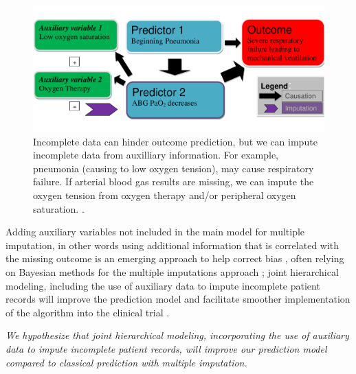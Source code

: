 \documentclass[11pt,notitlepage]{article}
\begin{document}
\begin{figure} 
 \vspace{-30pt}
 \includegraphics[scale=0.4]{Figures/Bayesian_imputation.pdf}
    \vspace{-20pt}
  \caption{\footnotesize Incomplete data can hinder outcome prediction, but we can impute incomplete data from auxilliary information. For example, pneumonia (causing to low oxygen tension), may cause respiratory failure. If arterial blood gas results are missing, we can impute the oxygen tension from oxygen therapy and/or peripheral oxygen saturation.  \cite{Hall_25389642}.}
   \vspace{-20pt}
    \label{fig:Imputation_fig}
\end{figure}

Adding auxiliary variables not included in the main model for multiple imputation, in other words using additional information that is correlated with the missing outcome is an emerging approach to help correct bias \cite{Meng_1994, Collins_11778676, Rubin_1996}, often relying on Bayesian methods for the multiple imputations approach \cite{Daniels_2008, Schafer_1997}; joint hierarchical modeling, including the use of auxiliary data to impute incomplete patient records will improve the prediction model and facilitate smoother implementation of the algorithm into the clinical trial \cite{Hall_25389642}.

\emph{We hypothesize that joint hierarchical modeling, incorporating the use of auxiliary data to impute incomplete patient records, will improve our prediction model compared to classical prediction with multiple imputation.}
\end{document}
